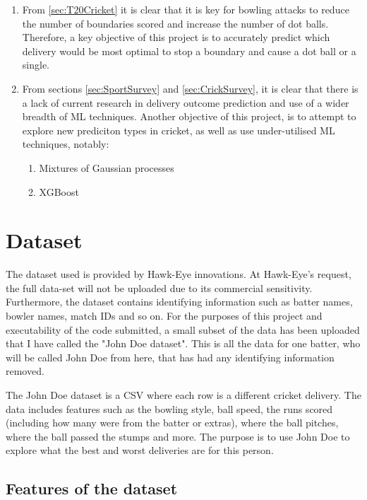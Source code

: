 \documentclass[12pt,a4paper]{report}
\theoremstyle{definition}
\begin{document}
\begin{enumerate}
  \item From \ref{sec:T20Cricket} it is clear that it is key for bowling attacks to reduce the number of boundaries scored and increase the number of dot balls.
Therefore, a key objective of this project is to accurately predict which delivery would be most optimal to stop a boundary and cause a dot ball or a single.
  \item From sections \ref{sec:SportSurvey} and \ref{sec:CrickSurvey}, it is clear that there is a lack of current research in delivery outcome prediction and use of a wider breadth of ML techniques. 
Another objective of this project, is to attempt to explore new prediciton types in cricket, as well as use under-utilised  ML techniques, notably:
  \begin{enumerate}
	\item Mixtures of Gaussian processes
	\item XGBoost
  \end{enumerate}
\end{enumerate}

\section{Dataset} \label{sec:Dataset}

The dataset used is provided by Hawk-Eye innovations.
At Hawk-Eye's request, the full data-set will not be uploaded due to its commercial sensitivity.
Furthermore, the dataset contains identifying information such as batter names, bowler names, match IDs and so on.
For the purposes of this project and executability of the code submitted, a small subset of the data has been uploaded that I have called the "John Doe dataset". 
This is all the data for one batter, who will be called John Doe from here, that has had any identifying information removed.

The John Doe dataset is a CSV where each row is a different cricket delivery. 
The data includes features such as the bowling style, ball speed, the runs scored (including how many were from the batter or extras), where the ball pitches, where the ball passed the stumps and more.     
The purpose is to use John Doe to explore what the best and worst deliveries are for this person.

\subsection{Features of the dataset}
\end{document}
